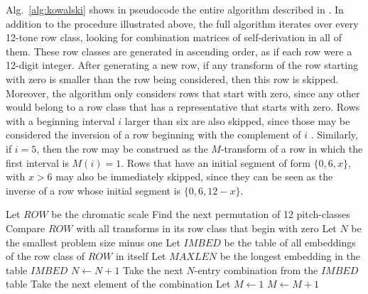 Alg.~\ref{alg:kowalski} shows in pseudocode the entire algorithm described in \cite{Kowalski1987b}. In addition to the procedure illustrated above, the full algorithm iterates over every 12-tone row class, looking for combination matrices of self-derivation in all of them. These row classes are generated in ascending order, as if each row were a 12-digit integer. After generating a new row, if any transform of the row starting with zero is smaller than the row being considered, then this row is skipped. Moreover, the algorithm only considers rows that start with zero, since any other would belong to a row class that has a representative that starts with zero. Rows with a beginning interval $i$ larger than six are also skipped, since those may be considered the inversion of a row beginning with the complement of $i$ \cite[34]{Kowalski1987b}. Similarly, if $i = 5$, then the row may be construed as the $M$-transform of a row in which the first interval is $M(i) = 1$. Rows that have an initial segment of form $\{0, 6, x\}$, with $x > 6$ may also be immediately skipped, since they can be seen as the inverse of a row whose initial segment is $\{0, 6, 12 - x\}$.

\begin{algorithm}
\caption{\cite[35, 36, 37]{Kowalski1987b}}
\label{alg:kowalski}
\DontPrintSemicolon
{}
Let $ROW$ be the chromatic scale\;
Find the next permutation of 12 pitch-classes\;
Compare $ROW$ with all transforms in its row class that begin with zero\;
Let $N$ be the smallest problem size minus one\;
Let $IMBED$ be the table of all embeddings of the row class of $ROW$ in itself\;
Let $MAXLEN$ be the longest embedding in the table $IMBED$\;
$N \gets N + 1$\;
Take the next $N$-entry combination from the $IMBED$ table\;
Take the next element of the combination\;
Let $M \gets 1$\;
$M \gets M + 1$\;
\end{algorithm}

